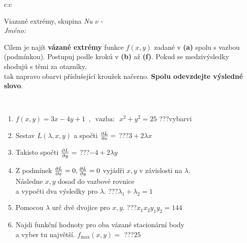 \documentclass[10pt]{report}
\begin{document}
\begin{tabular}{c:c}
\begin{minipage}[c][104.5mm][t]{0.5\linewidth}
\begin{center}
\vspace{7mm}
{\huge Viazané extrémy, skupina \textit{Nu $\nu$} -}\\[5mm]
\textit{Jméno:}\phantom{xxxxxxxxxxxxxxxxxxxxxxxxxxxxxxxxxxxxxxxxxxxxxxxxxxxxxxxxxxxxxxxxx}\\[5mm]
\begin{minipage}{0.95\linewidth}
\begin{center}
Cílem je najít \textbf{vázané extrémy} funkce $f(x,y)$ zadané v \textbf{(a)} spolu s vazbou (podmínkou). Postupuj podle krokú v \textbf{(b)} až \textbf{(f)}. Pokud se medzivýsledky shodujú s těmi za otazníky,\\tak napravo obarvi příslušející kroužek načerno. \textbf{Spolu odevzdejte výsledné slovo}.
\end{center}
\end{minipage}
\\[1mm]
\begin{minipage}{0.79\linewidth}
\begin{center}
\begin{varwidth}{\linewidth}
\begin{enumerate}
\normalsize
\item $f(x,y)=3x-4y+1 \enspace , \enspace \mathrm{vazba:} \enspace x^2+y^2=25$\quad \dotfill\; ???\;\dotfill \quad vybarvi
\item Sestav $L(\lambda,x,y)$ a spočti $\pdv{L}{x}=$\quad \dotfill\; ???\;\dotfill \quad $3+2\lambda x$
\item Takisto spočti $\pdv{L}{y}=$\quad \dotfill\; ???\;\dotfill \quad $-4+2\lambda y$
\item Z podmínek $\pdv{L}{x}=0 , \pdv{L}{y}=0$ vyjádři $x,y$ v závislosti na $\lambda$.\\ \phantom{xxxxxx}Následne $x,y$ dosaď do vazbové rovnice\\ \phantom{xxxxxx}a vypočti dva výsledky pro $\lambda$.\quad \dotfill\; ???\;\dotfill \quad $\lambda_1+\lambda_2=1$
\item Pomocou $\lambda$ urč dvě dvojice pro $x,y$.\quad \dotfill\; ???\;\dotfill \quad $x_1 x_2 y_1 y_2=144$
\item Najdi funkční hodnoty pro oba vázané stacionární body\\ \phantom{xxxxxx}a vyber tu najvětší. $f_{\text{max}}(x,y)=$\quad \dotfill\; ???\;\dotfill \quad $25$

\end{enumerate}
\end{varwidth}
\end{center}
\end{minipage}
\end{center}
\end{minipage}
\end{tabular}
\end{document}
